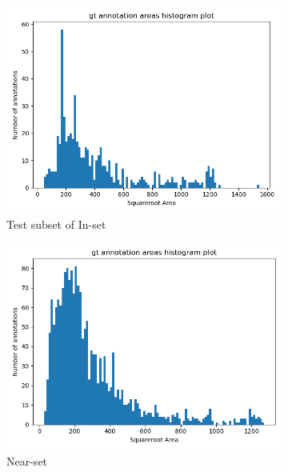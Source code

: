 \documentclass[oneside, english, bibtex]{kththesis}
\begin{document}
\begin{figure}[H]
\begin{adjustbox}{max width=1.5\linewidth,center}
\begin{subfigure}{.5\textwidth}
  \centering
  \includegraphics[width=\linewidth]{figures/annotation-histogram-inset.png}
  \caption{Test subset of In-set}
  \label{fig:size_dist_annotations_in}
\end{subfigure}%
\begin{subfigure}{.5\textwidth}
  \centering
  \includegraphics[width=\linewidth]{figures/annotation-histogram-nearset.png}
  \caption{Near-set}
  \label{fig:size_dist_annotations_near}
\end{subfigure}
\begin{subfigure}{.5\textwidth}

\end{subfigure}
\end{adjustbox}
\end{figure}
\end{document}

